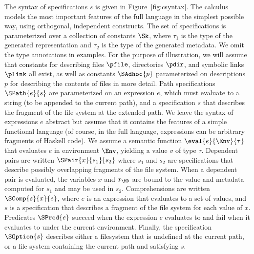 The syntax of specifications $s$ is given in
Figure~\ref{fig:csyntax}. The calculus models the most important
features of the full \forest{} language in the simplest possible way,
using orthogonal, independent constructs. The set of specifications is
parameterized over a collection of constants $\Sk$, where $\tau_1$ is
the type of the generated representation and $\tau_2$ is the type of
the generated metadata. We omit the type annotations in examples.  For
the purpose of illustration, we will assume that constants for
describing files $\pfile$, directories $\pdir$, and symbolic links
$\plink$ all exist, as well as constants $\SAdhoc{p}$ parameterized on
\padshaskell{} descriptions $p$ for describing the contents of files
in more detail. Path specifications $\SPath{e}{s}$ are parameterized
on an expression $e$, which must evaluate to a string (to be appended
to the current path), and a specification $s$ that describes the
fragment of the file system at the extended path. We leave the syntax
of expressions $e$ abstract but assume that it contains the features
of a simple functional language (of course, in the full \forest{}
language, expressions can be arbitrary fragments of Haskell code). We
assume a semantic function $\eval{e}{\Env}{\tau}$ that evaluates $e$
in environment $\Env$, yielding a value $v$ of type $\tau$. Dependent
pairs are written $\SPair{x}{s_1}{s_2}$ where $s_1$ and $s_2$ are
specifications that describe possibly overlapping fragments of the
file system. When a dependent pair is evaluated, the variables $x$ and
$x_{\MD}$ are bound to the value and metadata computed for $s_1$ and
may be used in $s_2$. Comprehensions are written $\SComp{s}{x}{e}$,
where $e$ is an expression that evaluates to a set of values, and $s$
is a specification that describes a fragment of the file system for
each value of $x$.  Predicates $\SPred{e}$ succeed when the expression
$e$ evaluates to \True{} and fail when it evaluates to \False{} under
the current environment.  Finally, the specification $\SOption{s}$
describes either a filesystem that is undefined at the current path,
or a file system containing the current path and satisfying $s$.

